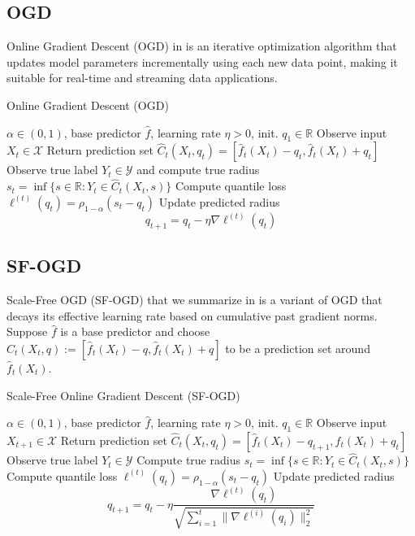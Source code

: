 \subsection{OGD}
Online Gradient Descent (OGD) in  is an iterative optimization algorithm that updates model parameters incrementally using each new data point, making it suitable for real-time and streaming data applications.
\begin{algorithm}[H]
\caption{Online Gradient Descent (OGD)}\label{algorithm2}
\begin{algorithmic}[1]
\Require $\alpha \in (0, 1)$, base predictor $\hat{f}$, learning rate $\eta > 0$, init. $q_1 \in \mathbb{R}$
    \State Observe input $X_t \in \mathcal{X}$ 
    \State Return prediction set $\hat{C}_t(X_t, q_t)=[\hat{f}_{t}(X_{t})-q_t,\hat{f}_{t}(X_{t})+q_t]$
    \State Observe true label $Y_t \in \mathcal{Y}$ and compute true radius $s_t = \inf\{s \in \mathbb{R} : Y_t \in \hat{C}_t(X_t, s)\}$
    \State Compute quantile loss $\ell^{(t)}(q_t) = \rho_{1-\alpha}(s_t-q_t)$
    \State Update predicted radius
    \[
    q_{t+1} = q_t - \eta \nabla \ell^{(t)}(q_t)
    \]
\EndFor
\end{algorithmic}
\end{algorithm}

\subsection{SF-OGD}
 Scale-Free OGD (SF-OGD) that we summarize in   is a variant of OGD that decays its effective learning rate based on cumulative  past gradient norms. Suppose $\hat{f}$ is a base predictor and choose $\widehat{C}_{t}(X_{t},q):=[\hat{f}_{t}(X_{t})-q,\hat{f}_{t}(X_{t})+q]$ to be a prediction set around $\hat{f}_{t}(X_{t})$.

\begin{algorithm}[H]
\caption{Scale-Free Online Gradient Descent (SF-OGD)}\label{algorithm3}
\begin{algorithmic}[1]
\Require $\alpha \in (0, 1)$, base predictor $\hat{f}$, learning rate $\eta > 0$, init. $q_1 \in \mathbb{R}$
    \State Observe input $X_{t+1} \in \mathcal{X}$
    \State Return prediction set $\hat{C}_t(X_{t}, q_{t})=[\hat{f}_{t}(X_{t})-q_{t+1},\hat{f}_{t}(X_{t})+q_{t}]$ 
    \State Observe true label $Y_t \in \mathcal{Y}$
    \State Compute true radius $s_t = \inf\{s \in \mathbb{R} : Y_t \in \hat{C}_t(X_t, s)\}$
    \State Compute quantile loss $\ell^{(t)}(q_t) = \rho_{1-\alpha}(s_t-q_t)$
    \State Update predicted radius
    \[
    q_{t+1} = q_t - \eta \frac{\nabla \ell^{(t)}(q_t)}{\sqrt{\sum_{i=1}^{t} \|\nabla \ell^{(i)}(q_i)\|_2^2}}
    \]
\EndFor
\end{algorithmic}
\end{algorithm}

